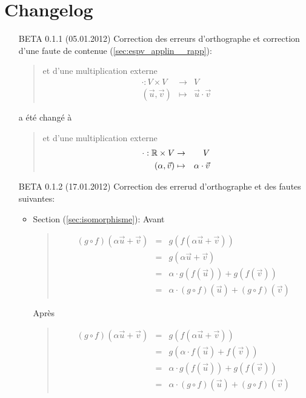 \chapter{Changelog}
\begin{itemize}
  \item[BETA 0.1.1 (05.01.2012)] Correction des erreurs d'orthographe et correction d'une faute de contenue (\ref{sec:espv_applin__rapp}):
    \begin{quote}
      et d'une multiplication externe
      \begin{eqnarray*}
        \cdot: V \times V &\rightarrow& V \\
        (\vec{u}, \vec{v}) &\mapsto&  \vec{u} \cdot \vec{v}
      \end{eqnarray*}
    \end{quote}
    a été changé à
    \begin{quote}
      et d'une multiplication externe
      \begin{eqnarray*}
        \cdot: \mathbb{R} \times V &\rightarrow& V \\
        (\alpha, \vec{v}) &\mapsto& \alpha \cdot \vec{v}
      \end{eqnarray*}
    \end{quote}

  \item[BETA 0.1.2 (17.01.2012)] Correction des errerud d'orthographe et des fautes suivantes:
    \begin{itemize}
      \item Section (\ref{sec:isomorphisme}): Avant
        \begin{quote}
          \begin{eqnarray*}
            (g \circ f)(\alpha \vec{u} +\vec{v}) &=& g(f(\alpha \vec{u} +\vec{v})) \\
              &=& g(\alpha \vec{u} + \vec{v}) \\
              &=& \alpha \cdot g(f(\vec{u})) + g(f(\vec{v})) \\
              &=& \alpha \cdot (g \circ f)(\vec{u}) + (g \circ f)(\vec{v})
          \end{eqnarray*}
        \end{quote}
        Après
        \begin{quote}
          \begin{eqnarray*}
            (g \circ f)(\alpha \vec{u} +\vec{v}) &=& g(f(\alpha \vec{u} +\vec{v})) \\
              &=& g(\alpha \cdot f(\vec{u}) + f(\vec{v})) \\
              &=& \alpha \cdot g(f(\vec{u})) + g(f(\vec{v})) \\
              &=& \alpha \cdot (g \circ f)(\vec{u}) + (g \circ f)(\vec{v})
          \end{eqnarray*}
        \end{quote}
      

\end{itemize}
\end{itemize}
